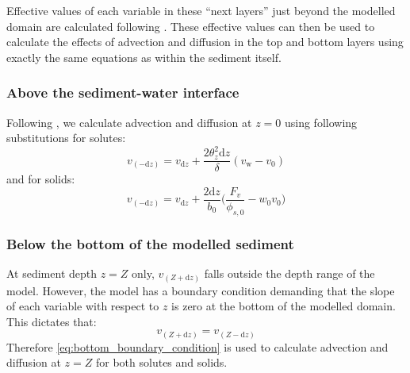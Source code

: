 \documentclass[a4paper]{article}
\newcommand{\D}[1]{\mathrm{d}#1}
\begin{document}
Effective values of each variable in these ``next layers'' just beyond the modelled domain are calculated following \citet{boudreau_method--lines_1996}.  These effective values can then be used to calculate the effects of advection and diffusion in the top and bottom layers using exactly the same equations as within the sediment itself.


\subsubsection{Above the sediment-water interface}

Following \citet{boudreau_method--lines_1996}, we calculate advection and diffusion at $z = 0$ using following substitutions for solutes:
\begin{equation}\label{Dv0}
v_{(-\D{z})} = v_{\D{z}} + \frac{2 \theta_z^2 \D{z}}{\delta} (v_\mathrm{w} - v_0)
\end{equation}
and for solids:
\begin{equation}
v_{(-\D{z})} = v_{\D{z}} + \frac{2 \D{z}}{b_0} \Bigg( \frac{F_v}{\phi_{s, 0}} - w_0 v_0 \Bigg)
\end{equation}


\subsubsection{Below the bottom of the modelled sediment}

At sediment depth $z = Z$ only, $v_{(Z+\D{z})}$ falls outside the depth range of the model.  However, the model has a boundary condition demanding that the slope of each variable with respect to $z$ is zero at the bottom of the modelled domain.  This dictates that:
\begin{equation}\label{eq:bottom_boundary_condition}
v_{(Z+\D{z})} = v_{(Z-\D{z})}
\end{equation}
Therefore \eqref{eq:bottom_boundary_condition} is used to calculate advection and diffusion at $z = Z$ for both solutes and solids.


\end{document}
